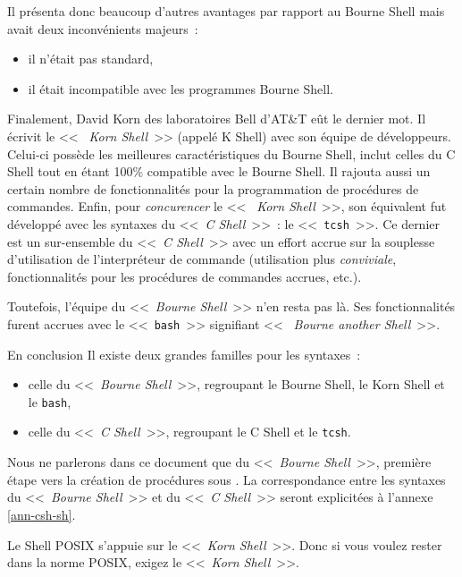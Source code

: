 Il pr{\'e}senta donc beaucoup d'autres avantages par rapport au Bourne Shell mais avait deux
inconv{\'e}nients majeurs~:
\begin{itemize}
	\item	il n'{\'e}tait pas standard,
	\item	il {\'e}tait incompatible avec les programmes Bourne Shell.
\end{itemize}

Finalement, David {\sc Korn} des laboratoires {\sc Bell} d'AT\&T e{\^u}t
le dernier mot. Il {\'e}crivit le <<~{\sl
Korn Shell}~>> (appel{\'e} K Shell) avec son {\'e}quipe de
d{\'e}veloppeurs. Celui-ci poss{\`e}de les meilleures
caract{\'e}ristiques du Bourne Shell, inclut celles du C Shell tout en
{\'e}tant 100\% compatible avec le Bourne Shell. Il rajouta aussi un
certain nombre de fonctionnalit{\'e}s pour la programmation de
proc{\'e}dures de commandes. Enfin, pour {\sl concurencer} le <<~{\sl
Korn Shell}~>>, son {\'e}quivalent fut d{\'e}velopp{\'e} avec les
syntaxes du <<~{\sl C Shell}~>>~: le <<~{\tt tcsh}~>>. Ce dernier est un
sur-ensemble du <<~{\sl C Shell}~>> avec un effort accrue sur la
souplesse d'utilisation de l'interpr{\'e}teur de commande (utilisation
plus {\it conviviale}, fonctionnalit{\'e}s pour les proc{\'e}dures de
commandes accrues, etc.).

Toutefois, l'{\'e}quipe du <<~{\sl Bourne Shell}~>> n'en resta pas
l{\`a}. Ses fonctionnalit{\'e}s furent accrues avec le
<<~{\tt bash}~>> signifiant <<~{\sl
Bourne another Shell}~>>.

\begin{definition}{En conclusion}
Il existe deux grandes familles pour les syntaxes~:
\begin{itemize}
	\item	celle du <<~{\sl Bourne Shell}~>>, regroupant
			le Bourne Shell, le Korn Shell et le {\tt bash},
	\item	celle du <<~{\sl C Shell}~>>, regroupant
			le C Shell et le {\tt tcsh}.
\end{itemize}
Nous ne parlerons dans ce document que du <<~{\sl Bourne Shell}~>>,
premi{\`e}re {\'e}tape vers la cr{\'e}ation de proc{\'e}dures sous
{\Unix}. La correspondance entre les syntaxes du <<~{\sl Bourne
Shell}~>> et du <<~{\sl C Shell}~>> seront explicit{\'e}es {\`a}
l'annexe \ref{ann-csh-sh}.
\end{definition}

\begin{remarque}
Le Shell POSIX s'appuie sur le <<~{\sl Korn Shell}~>>. Donc si vous
voulez rester dans la norme POSIX, exigez le <<~{\sl Korn Shell}~>>.
\end{remarque}


